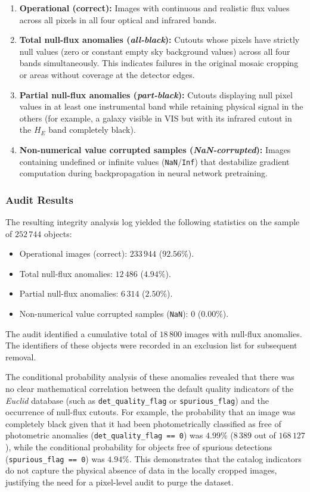 \begin{enumerate}
\item \textbf{Operational (correct):} Images with continuous and realistic flux values across all pixels in all four optical and infrared bands.
\item \textbf{Total null-flux anomalies (\textit{all-black}):} Cutouts whose pixels have strictly null values (zero or constant empty sky background values) across all four bands simultaneously. This indicates failures in the original mosaic cropping or areas without coverage at the detector edges.
\item \textbf{Partial null-flux anomalies (\textit{part-black}):} Cutouts displaying null pixel values in at least one instrumental band while retaining physical signal in the others (for example, a galaxy visible in VIS but with its infrared cutout in the $H_E$ band completely black).
\item \textbf{Non-numerical value corrupted samples (\textit{NaN-corrupted}):} Images containing undefined or infinite values (\texttt{NaN}/\texttt{Inf}) that destabilize gradient computation during backpropagation in neural network pretraining.
\end{enumerate}

\subsubsection{Audit Results}

The resulting integrity analysis log yielded the following statistics on the sample of $252\,744$ objects:

\begin{itemize}
\item Operational images (correct): $233\,944$ ($92.56\%$).
\item Total null-flux anomalies: $12\,486$ ($4.94\%$).
\item Partial null-flux anomalies: $6\,314$ ($2.50\%$).
\item Non-numerical value corrupted samples (\texttt{NaN}): $0$ ($0.00\%$).
\end{itemize}

The audit identified a cumulative total of $18\,800$ images with null-flux anomalies. The identifiers of these objects were recorded in an exclusion list for subsequent removal.

The conditional probability analysis of these anomalies revealed that there was no clear mathematical correlation between the default quality indicators of the \textit{Euclid} database (such as \texttt{det\_quality\_flag} or \texttt{spurious\_flag}) and the occurrence of null-flux cutouts. For example, the probability that an image was completely black given that it had been photometrically classified as free of photometric anomalies (\texttt{det\_quality\_flag == 0}) was $4.99\%$ ($8\,389$ out of $168\,127$), while the conditional probability for objects free of spurious detections (\texttt{spurious\_flag == 0}) was $4.94\%$. This demonstrates that the catalog indicators do not capture the physical absence of data in the locally cropped images, justifying the need for a pixel-level audit to purge the dataset.

